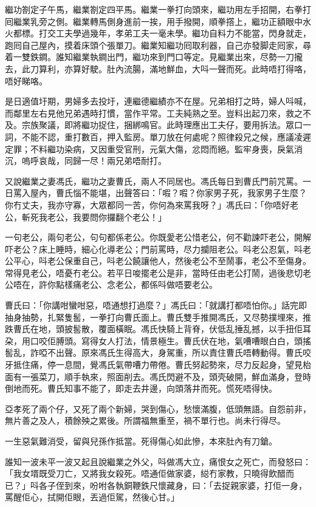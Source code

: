 \documentclass[a5paper, 12pt, openany]{book} %
\begin{document}
	繼功劄定子午馬，繼業劄定四平馬。繼業一拳打向頭來，繼功用左手招開，右拳打囘繼業乳旁之側。繼業轉馬側身進前一挨，用手撥開，順拳撘上，繼功正額眼中水火都標。打交工夫學過幾年，孝弟工夫一毫未學。繼功自料力不能當，閃身就走，跑囘自己屋內，摸着床頭个張單刀。繼業知繼功囘取利器，自己亦發脚走囘家，尋着一雙鉄鐧。誰知繼業執鐧出門，繼功來到門口等定。見繼業出來，尽勢一刀攏去，此刀算利，亦算好駛。肚內流腸，滿地鮮血，大呌一聲而死。此時唔打得咯，唔好睇咯。

	是日適值圩期，男婦多去投圩，連繼德繼績亦不在屋。兄弟相打之時，婦人呌喊，而鄰里左右見他兄弟遇時打慣，當作平常。工夫純熟之至。豈料出起刀來，救之不及。宗族聚議，即將繼功捉住，捆綁鳴官。此時理應出工夫仔，要用拆法。眾口一詞，不能不認，重打數百，押入監房。單刀放在何處呢？照律殺兄之候，應議凌遲定罪；不料繼功染病，又因重受官刑，元氣大傷，忿悶而絕。監牢身喪，戾氣消沉，嗚呼哀哉，同歸一尽！兩兄弟唔耐打。

	又說繼業之妻馮氏，繼功之妻曹氏，兩人不同居也。馮氏每日到曹氏門前咒罵。一日罵入屋內，曹氏惱不能堪，出聲答曰：「㗇？㗇？你家男子死，我家男子生麼？你冇丈夫，我亦守寡，大眾都同一苦，你何為來罵我呀？」馮氏曰：「你唔好老公，斬死我老公，我要問你攞翻个老公！」

	一句老公，兩句老公，句句都係老公。你既愛老公惜老公，何不勸諫吓老公，開解吓老公？床上睡時，細心化導老公；門前罵時，尽力攔阻老公。呌老公忍氣，呌老公平心，呌老公保重自己，呌老公饒讓他人，然後老公不至鬧事，老公不至傷身。常得見老公，唔憂冇老公。若平日唆擺老公是非，當時任由老公打鬧，過後悲切老公唔在，許你點樣痛老公、念老公，都係呌做唔要老公。

	曹氏曰：「你講咁蠻咁惡，唔通想打過麼？」馮氏曰：「就講打都唔怕你。」話完即抽身抽勢，扎緊隻䯻，一拳打向曹氏面上。曹氏雙手推開馮氏，又尽勢撲埋來，推跌曹氏在地，頭披䯻散，覆面橫眠。馮氏快騎上背脊，伏低乱捶乱撼，以手扭佢耳朶，用口咬佢膊頭。寫得女人打法，情景極生。曹氏伏在地，氣嘈嘈眼白白，頭搖䯻乱，詐啞不出聲。原來馮氏生得高大，身駕重，所以責住曹氏唔轉動得。曹氏咬牙抵住痛，停一息間，覺馮氏氣帶嘈力帶倦。曹氏努起勢來，尽力反起身，望見枱面有一張菜刀，順手執來，照面削去。馮氏閃避不及，頭壳破開，鮮血滿身，登時倒地而死。曹氏知事不能了，即走去井邊，向頭落井而死。慌死唔得快。

	亞孝死了兩个仔，又死了兩个新婦，哭到傷心，愁懷滿腹，低頭無語。自怨前非，無片善之及人，積餘殃之累後。所謂福無重至，禍不單行也。尚未行得尽。

	一生惡氣難消受，留與兒孫作抵當。死得傷心如此慘，本來肚內有刀鎗。

	誰知一波未平一波又起且說繼業之外父，呌做馮大立，痛恨女之死亡，而發怒曰：「我女壻既受刀亡，又將我女殺死。唔通佢做家婆，縂冇家教，只曉得飲醋而已？」呌各子侄到來，吩咐各執銅鞭鉄尺懷藏身，曰：「去捉親家婆，打佢一身，罵醒佢心，拭開佢眼，丟過佢駕，然後心甘。」
\end{document}
